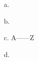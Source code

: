 a. \romannumeral\year\par
b. \uppercase{\romannumeral\year}\par
c. \uppercase{a---\romannumeral\year---z}\par
d. \uppercase\expandafter{\romannumeral\year}\par
\bye
